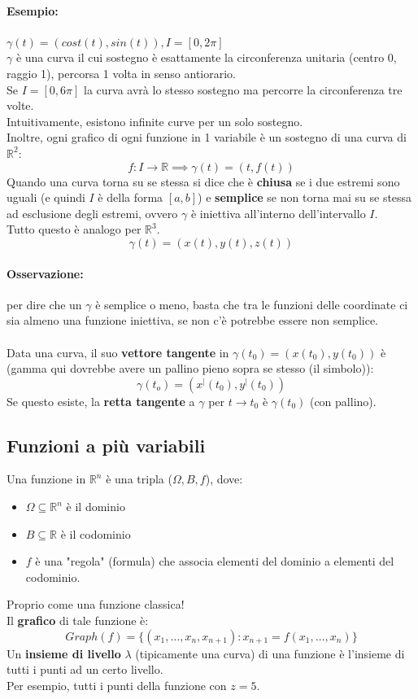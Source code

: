 \documentclass[12pt,a4paper]{article}
\begin{document}
\paragraph{Esempio:} $\gamma(t) = (cost(t),sin(t)), I = [0, 2\pi]$\\
$\gamma$ è una curva il cui sostegno è esattamente la circonferenza unitaria (centro 0, raggio 1), percorsa 1 volta in senso antiorario.\\
Se $I = [0,6\pi]$ la curva avrà lo stesso sostegno ma percorre la circonferenza tre volte.\\
Intuitivamente, esistono infinite curve per un solo sostegno.\\
Inoltre, ogni grafico di ogni funzione in 1 variabile è un sostegno di una curva di $\mathbb{R}^2$:
\[
f: I \to \mathbb{R} \implies \gamma(t) = (t,f(t))
\]
Quando una curva torna su se stessa si dice che è \textbf{chiusa} se i due estremi sono uguali (e quindi $I$ è della forma $[a,b]$) e \textbf{semplice} se non torna mai su se stessa ad esclusione degli estremi, ovvero $\gamma$ è iniettiva all'interno dell'intervallo $I$.\\
Tutto questo è analogo per $\mathbb{R}^3$.
\[
\gamma(t) = (x(t),y(t),z(t))
\]
\paragraph{Osservazione:} per dire che un $\gamma$ è semplice o meno, basta che tra le funzioni delle coordinate ci sia almeno una funzione iniettiva, se non c'è potrebbe essere non semplice.\\\\
Data una curva, il suo \textbf{vettore tangente} in $\gamma(t_0) = (x(t_0),y(t_0))$ è (gamma qui dovrebbe avere un pallino pieno sopra se stesso (il simbolo)):
\[
\gamma(t_o) = (x^|(t_0),y^|(t_0))
\]
Se questo esiste, la \textbf{retta tangente} a $\gamma$ per $t \to t_0$ è $\gamma(t_0)$ (con pallino).
\subsection{Funzioni a più variabili}
Una funzione in $\mathbb{R}^n$ è una tripla ($\Omega,B,f$), dove:
\begin{itemize}
  \item $\Omega \subseteq \mathbb{R}^n$ è il dominio
  \item $B \subseteq \mathbb{R}$ è il codominio
  \item $f$ è una "regola" (formula) che associa elementi del dominio a elementi del codominio.
\end{itemize}
Proprio come una funzione classica!\\
Il \textbf{grafico} di tale funzione è:
\[
Graph(f) = \{(x_1,\ldots,x_n,x_{n+1}) : x_{n+1} = f(x_1,\ldots,x_n)\}
\]
Un \textbf{insieme di livello} $\lambda$ (tipicamente una curva) di una funzione è l'insieme di tutti i punti ad un certo livello.\\
Per esempio, tutti i punti della funzione con $z = 5$.
\end{document}
